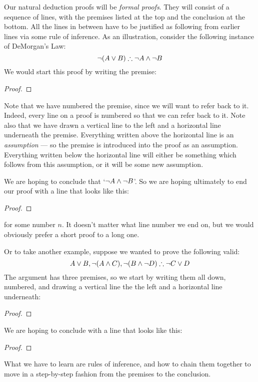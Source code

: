 Our natural deduction proofs will be \emph{formal proofs}.  They will consist of a sequence of lines, with the premises  listed at the top and the conclusion at the bottom.  All the lines in between have to be justified as following from earlier lines via some rule of inference. As an illustration, consider the following instance of DeMorgan's Law:
	$$\neg (A \vee B) \therefore \neg A \wedge \neg B$$
We would start this proof by writing the premise:
\begin{proof}
	 
\end{proof}
Note that we have numbered the premise, since we will want to refer back to it. Indeed, every line on a proof is numbered so that we can refer back to it.  Note also that we have drawn a vertical line to the left and a horizontal line underneath the premise. Everything written above the horizontal line is an \emph{assumption} --- so the premise is introduced into the proof as an assumption. Everything written below the horizontal line will either be something which follows from this assumption, or it will be some new assumption.

We are hoping to conclude that `$\neg A \wedge \neg B$'.  So we are hoping ultimately to end our proof with a line that looks like this:
\begin{proof}
\end{proof}
for some number $n$. It doesn't matter what line number we end on, but we would obviously prefer a short proof to a long one.

Or to take another example, suppose we wanted to prove the following valid:
$$A\vee B, \neg (A\wedge C), \neg (B \wedge \neg D) \therefore \neg C\vee D$$
The argument has three premises, so we start by writing them all down, numbered, and drawing a vertical line the the left and a horizontal line underneath:
\begin{proof}
	  
	 
	 
\end{proof}
We are hoping to conclude with a line that looks like this:
\begin{proof}
\end{proof}
What we have to learn are rules of inference, and how to chain them together to move in a step-by-step fashion from the premises to the conclusion.

